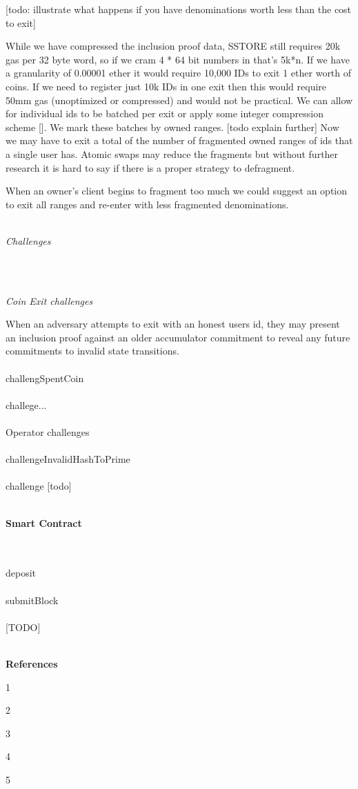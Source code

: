 \documentclass[11pt]{article}
\begin{document}
[todo: illustrate what happens if you have denominations worth less than the cost to exit]

While we have compressed the inclusion proof data, SSTORE still requires 20k gas per 32 byte word, so if we cram 4 * 64 bit numbers in that’s 5k*n. If we have a granularity of 0.00001 ether it would require 10,000 IDs to exit 1 ether worth of coins. If we need to register just 10k IDs in one exit then this would require 50mm gas (unoptimized or compressed) and would not be practical. We can allow for individual ids to be batched per exit or apply some integer compression scheme []. We mark these batches by owned ranges. [todo explain further] Now we may have to exit a total of the number of fragmented owned ranges of ids that a single user has. Atomic swaps may reduce the fragments but without further research it is hard to say if there is a proper strategy to defragment. 

When an owner’s client begins to fragment too much we could suggest an option to exit all ranges and re-enter with less fragmented denominations.
\\
\\

\centerline{\textit{Challenges}}
\\
\\

\centerline{\textit{Coin Exit challenges}}

When an adversary attempts to exit with an honest users id, they may present an inclusion proof against an older accumulator commitment to reveal any future commitments to invalid state transitions. 
\\
\\

challengSpentCoin
\\
\\

challege...
\\
\\

Operator challenges
\\
\\

challengeInvalidHashToPrime
\\
\\

challenge [todo]
\\
\\

\centerline{\textbf{Smart Contract}}
\\
\\

deposit
\\
\\

submitBlock
\\
\\

[TODO]
\\
\\
\centerline{\textbf{References}}

1 \url{}

2 \url{}

3 \url{}

4 \url{}

5 \url{}
\end{document}
